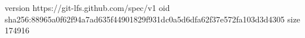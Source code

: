 version https://git-lfs.github.com/spec/v1
oid sha256:88965a0f62f94a7ad635f44901829f931dc0a5d6dfa62f37e572fa103d3d4305
size 174916
